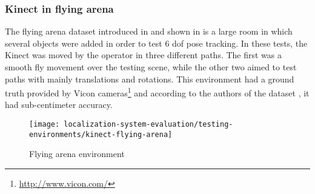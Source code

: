 \subsubsection{Kinect in flying arena}

The flying arena dataset introduced in \cite{Pomerleau2011} and shown in  is a large room in which several objects were added in order to test 6 \gls{dof} pose tracking. In these tests, the Kinect was moved by the operator in three different paths. The first was a smooth fly movement over the testing scene, while the other two aimed to test paths with mainly translations and rotations. This environment had a ground truth provided by Vicon cameras\footnote{\url{http://www.vicon.com/}} and according to the authors of the dataset \cite{Pomerleau2011}, it had sub-centimeter accuracy.

\begin{figure}[H]
	\centering
	\texttt{[image: localization-system-evaluation/testing-environments/kinect-flying-arena]}
	\caption{Flying arena environment \cite{Pomerleau2011}}
	\label{fig:localization-system-evaluation_flying-arena}
\end{figure}

